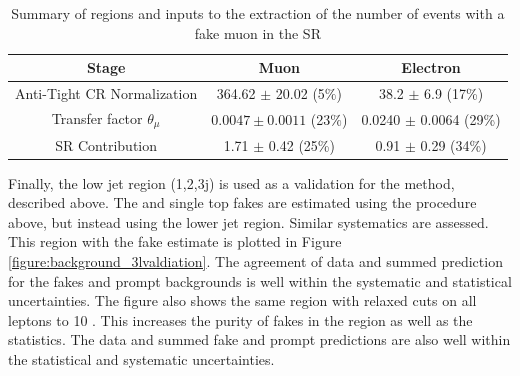 \begin{table}[!htbp]
\begin{center} 
\begin{tabular}{|c|c|c|} 
  \hline
  Stage   & Muon & Electron \\
  \hline
  Anti-Tight CR Normalization  &  364.62 $\pm$ 20.02 (5$\%$) & 38.2 $\pm$ 6.9 (17\%) \\ 
  \hline  
  Transfer factor $\theta_\mu$ & $0.0047 \pm 0.0011$ (23$\%$) & 0.0240 $\pm$ 0.0064 (29\%) \\
  SR Contribution & 1.71 $\pm$ 0.42 (25\%)           & 0.91 $\pm$ 0.29 (34\%) \\ 
  \hline  
\end{tabular}
\caption{Summary of regions and inputs to the extraction of the number of \btt events with a fake muon in the SR}
\label{table:background_3l_summary}
\end{center}
\end{table}


Finally, the low jet region (1,2,3j) is used as a validation for the method, described above. The \ttbar and single top fakes are estimated using the procedure above, but instead using the lower jet region. Similar systematics are assessed. This region with the fake estimate is plotted in Figure \ref{figure:background_3lvaldiation}. The agreement of data and summed prediction for the fakes and prompt backgrounds is well within the systematic and statistical uncertainties. The figure also shows the same region with relaxed \pt cuts on all leptons to 10 \gevcc. This increases the purity of fakes in the region as well as the statistics. The data and summed fake and prompt predictions are also well within the statistical and systematic uncertainties.


